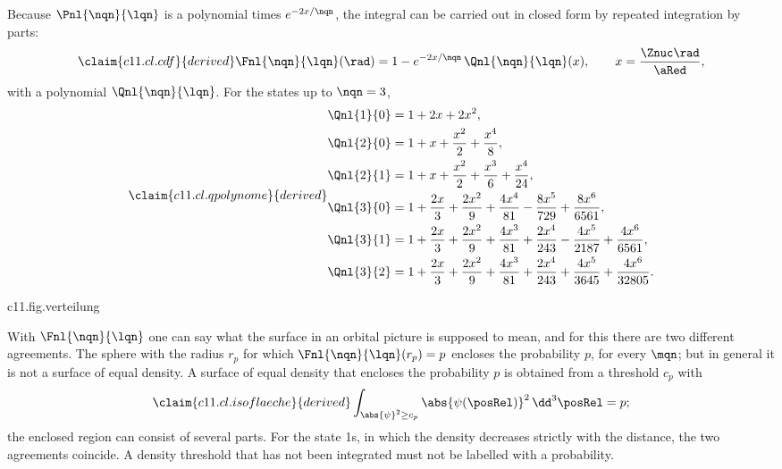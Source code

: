 \begin{vertiefung}
  Because $\Pnl{\nqn}{\lqn}$ is a polynomial times $e^{-2x/\nqn}$, the integral can be
  carried out in closed form by repeated integration by parts:
  \begin{equation}\label{c11.eq.cdf}\claim{c11.cl.cdf}{derived}
    \Fnl{\nqn}{\lqn}(\rad) = 1 - e^{-2x/\nqn}\,\Qnl{\nqn}{\lqn}(x),
    \qquad
    x = \frac{\Znuc\rad}{\aRed},
  \end{equation}
  with a polynomial $\Qnl{\nqn}{\lqn}$. For the states up to $\nqn = 3$,
  \begin{equation}\label{c11.eq.qpolynome}\claim{c11.cl.qpolynome}{derived}
    \begin{aligned}
      \Qnl{1}{0} &= 1 + 2x + 2x^2, \\
      \Qnl{2}{0} &= 1 + x + \frac{x^2}{2} + \frac{x^4}{8}, \\
      \Qnl{2}{1} &= 1 + x + \frac{x^2}{2} + \frac{x^3}{6} + \frac{x^4}{24}, \\
      \Qnl{3}{0} &= 1 + \frac{2x}{3} + \frac{2x^2}{9} + \frac{4x^4}{81}
                    - \frac{8x^5}{729} + \frac{8x^6}{6561}, \\
      \Qnl{3}{1} &= 1 + \frac{2x}{3} + \frac{2x^2}{9} + \frac{4x^3}{81}
                    + \frac{2x^4}{243} - \frac{4x^5}{2187} + \frac{4x^6}{6561}, \\
      \Qnl{3}{2} &= 1 + \frac{2x}{3} + \frac{2x^2}{9} + \frac{4x^3}{81}
                    + \frac{2x^4}{243} + \frac{4x^5}{3645} + \frac{4x^6}{32805}.
    \end{aligned}
  \end{equation}

  \begin{tpcfigure}{c11.fig.verteilung}
    \caption{The distribution functions $\Fnl{1}{0}$, $\Fnl{2}{0}$ and $\Fnl{2}{1}$
      according to \eqref{c11.eq.cdf} for $\Znuc = 1$: the probability of finding the
      distance smaller than $\rad$. At the node of 2s, the marked point at
      $\rad = 2\aRed$, $\Fnl{2}{0}$ has a horizontal tangent.}
  \end{tpcfigure}

  With $\Fnl{\nqn}{\lqn}$ one can say what the surface in an orbital picture is supposed
  to mean, and for this there are two different agreements. The sphere with the radius
  $r_p$ for which $\Fnl{\nqn}{\lqn}(r_p) = p$ encloses the probability $p$, for every
  $\mqn$; but in general it is not a surface of equal density. A surface of equal
  density that encloses the probability $p$ is obtained from a threshold $c_p$ with
  \begin{equation}\label{c11.eq.isoflaeche}\claim{c11.cl.isoflaeche}{derived}
    \int_{\abs{\psi}^2 \geq c_p} \abs{\psi(\posRel)}^2\,\dd^3\posRel = p ;
  \end{equation}
  the enclosed region can consist of several parts. For the state 1s, in which the
  density decreases strictly with the distance, the two agreements coincide. A density
  threshold that has not been integrated must not be labelled with a probability.
\end{vertiefung}

